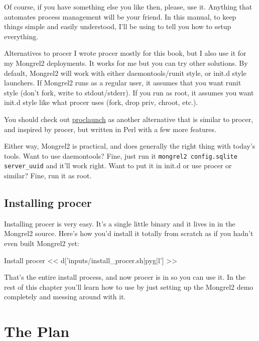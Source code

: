 Of course, if you have something else you like then, please, use it.  Anything that automates
process management will be your friend.  In this manual, to keep things simple and easily
understood, I'll be using  to tell you how to setup everything.

\begin{aside}{Alternatives to procer}
I wrote procer mostly for this book, but I also use it for my Mongrel2 deployments.
It works for me but you can try other solutions.  By default, Mongrel2 will work with
either daemontools/runit style, or init.d style launchers.  If Mongrel2 runs as a
regular user, it assumes that you want runit style (don't fork, write to stdout/stderr).
If you run as root, it assumes you want init.d style like what procer uses (fork, drop priv, 
chroot, etc.).

You should check out \href{http://github.com/peterkeen/proclaunch}{proclaunch} as another
alternative that is similar to procer, and inspired by procer, but written in Perl with a
few more features.

Either way, Mongrel2 is practical, and does generally the right thing with today's tools.
Want to use daemontools?  Fine, just run it \verb|mongrel2 config.sqlite server_uuid| and it'll
work right.  Want to put it in init.d or use procer or similar?  Fine, run it as root.
\end{aside}


\subsection{Installing procer}

Installing procer is very easy.  It's a single little binary and it lives in
 in the Mongrel2 source.  Here's how you'd install it
totally from scratch as if you hadn't even built Mongrel2 yet:

\begin{code}{Install procer}
<< d['inputs/install_procer.sh|pyg|l'] >>
\end{code}

That's the entire install process, and now procer is in 
so you can use it.  In the rest of this chapter you'll learn how to use 
by just setting up the Mongrel2 demo completely and messing around with it.



\section{The Plan}

